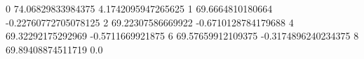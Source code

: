 0 74.06829833984375 4.1742095947265625
1 69.6664810180664 -0.22760772705078125
2 69.22307586669922 -0.6710128784179688
4 69.32292175292969 -0.5711669921875
6 69.57659912109375 -0.3174896240234375
8 69.89408874511719 0.0
